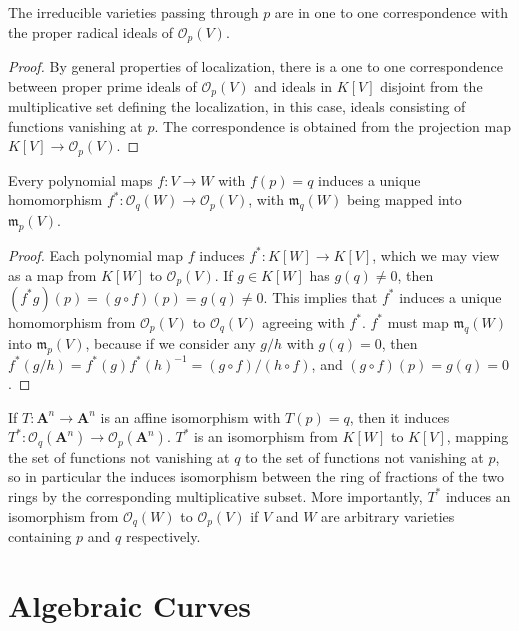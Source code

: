 \begin{prop}
    The irreducible varieties passing through $p$ are in one to one correspondence with the proper radical ideals of $\mathcal{O}_p(V)$.
\end{prop}
\begin{proof}
    By general properties of localization, there is a one to one correspondence between proper prime ideals of $\mathcal{O}_p(V)$ and ideals in $K[V]$ disjoint from the multiplicative set defining the localization, in this case, ideals consisting of functions vanishing at $p$. The correspondence is obtained from the projection map $K[V] \to \mathcal{O}_p(V)$.
\end{proof}

\begin{prop}
    Every polynomial maps $f: V \to W$ with $f(p) = q$ induces a unique homomorphism $f^*: \mathcal{O}_q(W) \to \mathcal{O}_p(V)$, with $\mathfrak{m}_q(W)$ being mapped into $\mathfrak{m}_p(V)$.
\end{prop}
\begin{proof}
    Each polynomial map $f$ induces $f^*: K[W] \to K[V]$, which we may view as a map from $K[W]$ to $\mathcal{O}_p(V)$. If $g \in K[W]$ has $g(q) \neq 0$, then $(f^* g)(p) = (g \circ f)(p) = g(q) \neq 0$. This implies that $f^*$ induces a unique homomorphism from $\mathcal{O}_p(V)$ to $\mathcal{O}_q(V)$ agreeing with $f^*$. $f^*$ must map $\mathfrak{m}_q(W)$ into $\mathfrak{m}_p(V)$, because if we consider any $g/h$ with $g(q) = 0$, then $f^*(g/h) = f^*(g)f^*(h)^{-1} = (g \circ f)/(h \circ f)$, and $(g \circ f)(p) = g(q) = 0$.
\end{proof}

If $T: \mathbf{A}^n \to \mathbf{A}^n$ is an affine isomorphism with $T(p) = q$, then it induces $T^*: \mathcal{O}_q(\mathbf{A}^n) \to \mathcal{O}_p(\mathbf{A}^n)$. $T^*$ is an isomorphism from $K[W]$ to $K[V]$, mapping the set of functions not vanishing at $q$ to the set of functions not vanishing at $p$, so in particular the induces isomorphism between the ring of fractions of the two rings by the corresponding multiplicative subset. More importantly, $T^*$ induces an isomorphism from $\mathcal{O}_q(W)$ to $\mathcal{O}_p(V)$ if $V$ and $W$ are arbitrary varieties containing $p$ and $q$ respectively.










\chapter{Algebraic Curves}

